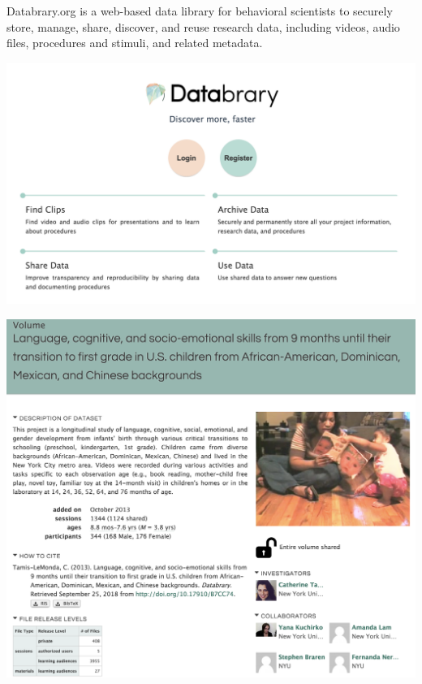 \documentclass[landscape,final,paperwidth=75in,paperheight=48in,fontscale=0.285]{baposter}
\begin{document}
\begin{poster}
{}
{
    Databrary.org is a web-based data library for behavioral scientists to securely store, manage, share, discover, and reuse research data, including videos, audio files, procedures and stimuli, and related metadata. 
    \vspace{-.5em}
    \begin{center}
    \includegraphics[scale=0.32,valign=t]{img/Databrary-DiscoverMore.png}
    \end{center}
}
{
\begin{center}
    \includegraphics[scale=0.32,valign=t]{img/volume8.png}

\end{center}}
\end{poster}
\end{document}
